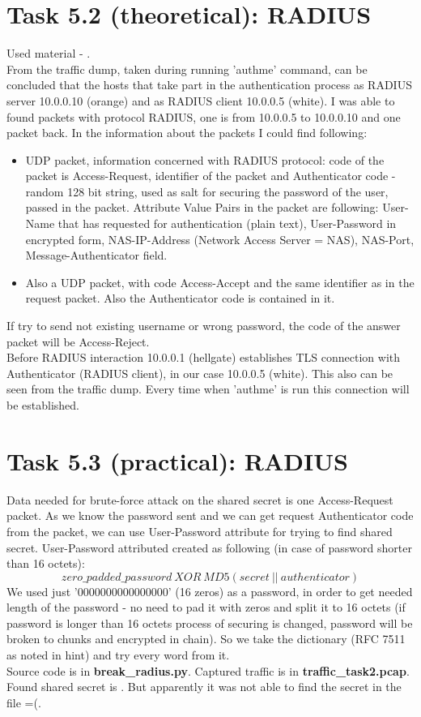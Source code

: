 \documentclass{article}
\begin{document}
\section*{Task 5.2 (theoretical): RADIUS}
Used material - \cite{radius}.
\\
From the traffic dump, taken during running 'authme' command, can be concluded that the hosts that take part in the authentication process as RADIUS server 10.0.0.10 (orange) and as RADIUS client 10.0.0.5 (white). I was able to found packets with protocol RADIUS, one is from 10.0.0.5 to 10.0.0.10 and one packet back. In the information about the packets I could find following:
\begin{itemize}
\item UDP packet, information concerned with RADIUS protocol: code of the packet is Access-Request, identifier of the packet and Authenticator code - random 128 bit string, used as salt for securing the password of the user, passed in the packet. Attribute Value Pairs in the packet are following: User-Name that has requested for authentication (plain text), User-Password in encrypted form, NAS-IP-Address (Network Access Server = NAS), NAS-Port, Message-Authenticator field.
\item Also a UDP packet, with code Access-Accept and the same identifier as in the request packet. Also the Authenticator code is contained in it.
\end{itemize}
If try to send not existing username or wrong password, the code of the answer packet will be Access-Reject.
\\
Before RADIUS interaction 10.0.0.1 (hellgate) establishes TLS connection with Authenticator (RADIUS client), in our case 10.0.0.5 (white). This also can be seen from the traffic dump. Every time when 'authme' is run this connection will be established.

\section*{Task 5.3 (practical): RADIUS}
Data needed for brute-force attack on the shared secret is one Access-Request packet. As we know the password sent and we can get request Authenticator code from the packet, we can use User-Password attribute for trying to find shared secret. User-Password attributed created as following (in case of password shorter than 16 octets): 
$$zero\_padded\_password \ XOR \ MD5(secret \ || \ authenticator)$$
We used just '0000000000000000' (16 zeros) as a password, in order to get needed length of the password - no need to pad it with zeros and split it to 16 octets (if password is longer than 16 octets process of securing is changed, password will be broken to chunks and encrypted in chain). So we take the dictionary (RFC 7511 as noted in hint) and try every word from it.
\\
Source code is in \textbf{break\_radius.py}. Captured traffic is in \textbf{traffic\_task2.pcap}. Found shared secret is \textbf{}. But apparently it was not able to find the secret in the file =(.
\end{document}
